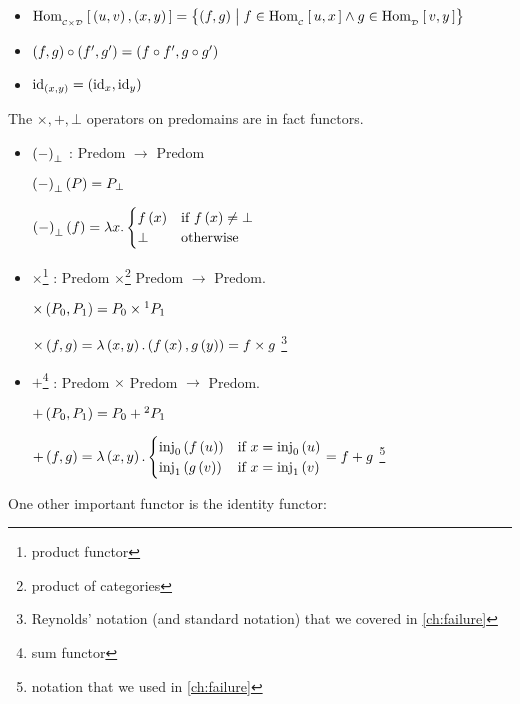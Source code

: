 \begin{enumcirc}
\begin{itemize}
		\item
		      $\Homset[\Cc \times \Dc]{\prths{u, v}}{\prths{x, y}} =
			      \set{\prths{f, g}}{f \in \Homset[\Cc]{u}{x} \wedge g \in \Homset[\Dc]{v}{y}}$
		\item
		      $\prths{f, g} \circ \prths{f', g'} = \prths{f \circ f', g \circ g'}$
		\item
		      $\id_{\prths{x, y}} = \prths{\id_x, \id_y}$
	\end{itemize}
	\item
	The $\times, +, \bot$ operators on predomains are in fact functors.
	\begin{itemize}
		\item
		      $\prths{-}_\bot$ : Predom $\to$ Predom

		      $\prths{-}_\bot \prths{P} = P_\bot$

		      $\prths{-}_\bot \prths{f} = \lambda x.
			      \begin{cases}
				      f\prths{x} & \text{if } f\prths{x} \neq \bot \\
				      \bot       & \text{otherwise}
			      \end{cases}
		      $
		\item
		      $\times$\footnote{product functor} : Predom $\times$\footnote{product of categories} Predom $\to$ Predom.

		      $\times \prths{P_0, P_1} = P_0 \times\footnotemark P_1$

		      $\times \prths{f, g} = \lambda \prths{x, y}. \prths{f\prths{x}, g\prths{y}} = f \times g$
		      \footnote{Reynolds' notation (and standard notation) that we covered in \cref{ch:failure}}
		\item
		      $+$\footnote{sum functor} : Predom $\times$ Predom $\to$ Predom.

		      $+ \prths{P_0, P_1} = P_0 +\footnotemark P_1$

		      $+ \prths{f, g} = \lambda \prths{x, y}. \begin{cases}
				      \inj_0 \prths{f\prths{u}} & \text{if } x = \inj_0 \prths{u} \\
				      \inj_1 \prths{g\prths{v}} & \text{if } x = \inj_1 \prths{v}
			      \end{cases}
			      = f + g$
		      \footnote{notation that we used in \cref{ch:failure}}
	\end{itemize}
	\item
	One other important functor is the identity functor:


\end{enumcirc}
